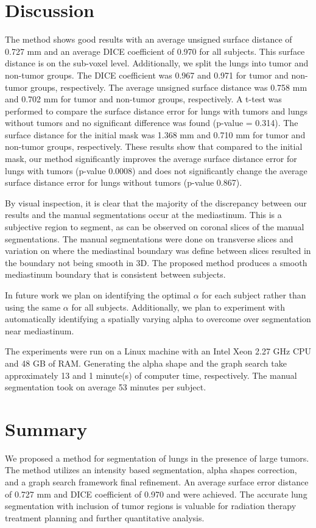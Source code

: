 \documentclass{llncs}
\begin{document}
%
\section{Discussion}
%

The method shows good results with an average unsigned surface distance of 0.727 mm and an average DICE coefficient of 0.970 for all subjects. This surface distance is on the sub-voxel level. Additionally, we split the lungs into tumor and non-tumor groups. The DICE coefficient was 0.967 and 0.971 for tumor and non-tumor groups, respectively. The average unsigned surface distance was 0.758 mm and 0.702 mm for tumor and non-tumor groups, respectively. A t-test was performed to compare the surface distance error for lungs with tumors and lungs without tumors and no significant difference was found (p-value = 0.314). The surface distance for the initial mask was 1.368 mm and 0.710 mm for tumor and non-tumor groups, respectively. These results show that compared to the initial mask, our method significantly improves the average surface distance error for lungs with tumors (p-value 0.0008) and does not significantly change the average surface distance error for lungs without tumors (p-value 0.867).

By visual inspection, it is clear that the majority of the discrepancy between our results and the manual segmentations occur at the mediastinum. This is a subjective region to segment, as can be observed on coronal slices of the manual segmentations. The manual segmentations were done on transverse slices and variation on where the mediastinal boundary was define between slices resulted in the boundary not being smooth in 3D. The proposed method produces a smooth mediastinum boundary that is consistent between subjects. 

In future work we plan on identifying the optimal $\alpha$ for each subject rather than using the same $\alpha$ for all subjects. Additionally, we plan to experiment with automatically identifying a spatially varying alpha to overcome over segmentation near mediastinum.

The experiments were run on a Linux machine with an Intel Xeon 2.27 GHz CPU and 48 GB of RAM. Generating the alpha shape and the graph search take approximately 13 and 1 minute(s) of computer time, respectively. The manual segmentation took on average 53 minutes per subject.
%
\section{Summary}
%
We proposed a method for segmentation of lungs in the presence of large tumors. The method utilizes an intensity based segmentation, alpha shapes correction, and a graph search framework final refinement. An average surface error distance of 0.727 mm and DICE coefficient of 0.970 and  were achieved. The accurate lung segmentation with  inclusion of tumor regions is valuable for radiation therapy treatment planning and further quantitative analysis.
%
\end{document}
